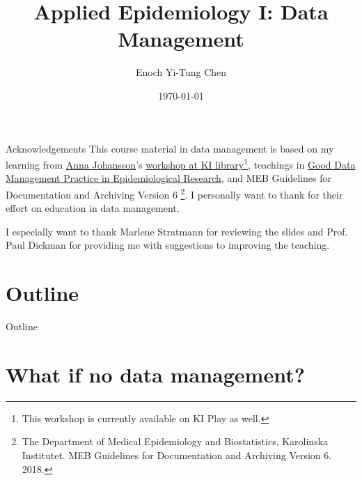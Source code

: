 


\title[Applied Epi I: Data Management]{Applied Epidemiology I: Data Management}
\date{\today}
\author[Enoch Yi-Tung Chen]{Enoch Yi-Tung Chen}




\begin{frame}
\maketitle 
\end{frame}

\begin{frame}{Acknowledgements}
This course material in data management is based on my learning from \href{https://staff.ki.se/people/annajo}{Anna Johansson}'s \href{https://play.ki.se/media/Data+Management+and+research+documentation+for+researchers/0_h64ki6v7?_ga=2.131118287.1557257458.1589785892-1364153581.1557067020}{workshop at KI library}\footnote{This workshop is currently available on KI Play as well. }, teachings in \href{https://kiwas.ki.se/katalog/katalog/kurs/851;jsessionid=e42ee2c1f6b081f28bf83e3d0321?lang=en}{Good Data Management Practice in Epidemiological Research}, and MEB Guidelines for Documentation and Archiving Version 6 \footnote{The Department of Medical Epidemiology and Biostatistics, Karolinska Institutet. MEB Guidelines for Documentation and Archiving Version 6. 2018.}. I personally want to thank for their effort on education in data management.

I especially want to thank Marlene Stratmann for reviewing the slides and Prof. Paul Dickman for providing me with suggestions to improving the teaching.

\end{frame}

\section*{Outline}
\begin{frame}{Outline}
          \tableofcontents
\end{frame}

\section{What if no data management?}


